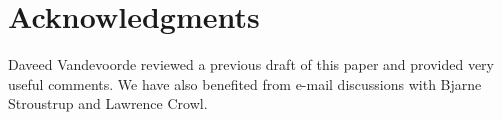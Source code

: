 \section*{Acknowledgments}

Daveed Vandevoorde reviewed a previous draft of this paper and provided very useful
comments. We have also benefited from e-mail discussions with Bjarne Stroustrup and
Lawrence Crowl.
